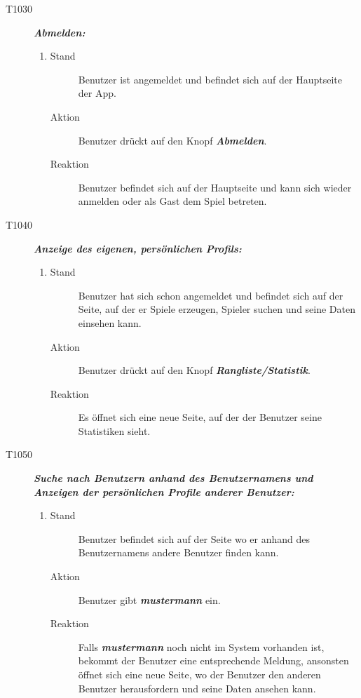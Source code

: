 \documentclass[parskip=full]{scrartcl}
\begin{document}
\begin{description}
\begin{enumerate}
		\end{enumerate}
		\item[T1030] \textbf{\textit{Abmelden: }} 
		\begin{enumerate}
			\item 
			\begin{description}
				\item[Stand] Benutzer ist angemeldet und befindet sich auf der Hauptseite der App.
				\item[Aktion] Benutzer drückt auf den Knopf \textbf{\textit{Abmelden}}.
				\item[Reaktion] Benutzer befindet sich auf der Hauptseite und kann sich wieder anmelden oder als Gast dem Spiel betreten.
			\end{description}
		\end{enumerate}
		
		\item[T1040] \textbf{\textit{Anzeige des eigenen, persönlichen Profils: }} 
		\begin{enumerate}
			\item 
			\begin{description}
				\item[Stand] Benutzer hat sich schon angemeldet und befindet sich auf der Seite, auf der er Spiele erzeugen, Spieler suchen und seine Daten einsehen kann.
				\item[Aktion] Benutzer drückt auf den Knopf \textbf{\textit{Rangliste/Statistik}}.
				\item[Reaktion] Es öffnet sich eine neue Seite, auf der der Benutzer seine Statistiken sieht.
			\end{description}
		\end{enumerate}
		
		\item[T1050] \textbf{\textit{Suche nach Benutzern anhand des Benutzernamens und Anzeigen der persönlichen Profile anderer Benutzer: }} 
		\begin{enumerate}
			\item 
			\begin{description}
				\item[Stand] Benutzer befindet sich auf der Seite wo er anhand des Benutzernamens andere Benutzer finden kann.
				\item[Aktion] Benutzer gibt \textbf{\textit{mustermann }}ein.
				\item[Reaktion] Falls \textbf{\textit{mustermann }}noch nicht im System vorhanden ist, bekommt der Benutzer eine entsprechende Meldung, ansonsten öffnet sich eine neue Seite, wo der Benutzer den anderen Benutzer herausfordern und seine Daten ansehen kann.
			\end{description}
		\end{enumerate}
		

\end{description}
\end{document}
